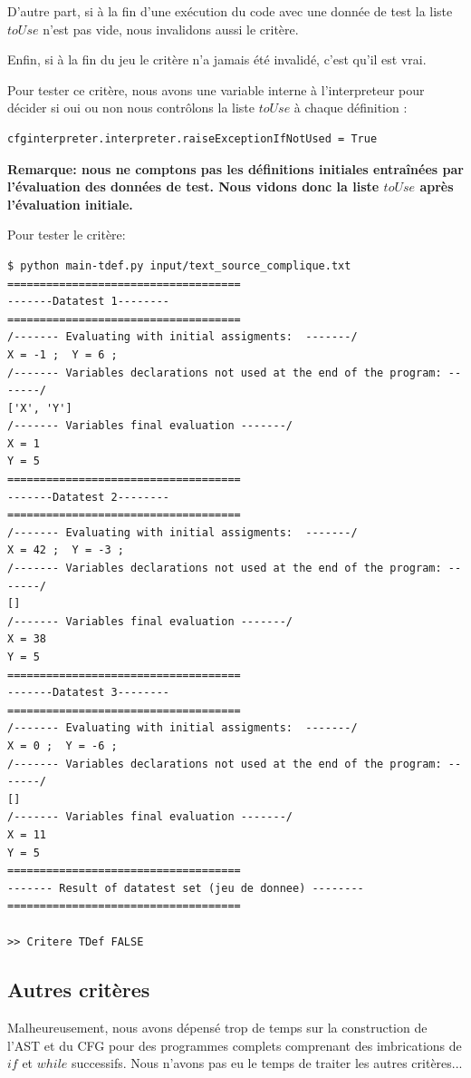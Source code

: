 \documentclass[a4paper]{article}
\begin{document}
D'autre part, si à la fin d'une exécution du code avec une donnée de test la liste $toUse$ n'est pas vide, nous invalidons aussi le critère. 

Enfin, si à la fin du jeu le critère n'a jamais été invalidé, c'est qu'il est vrai. 

Pour tester ce critère, nous avons une variable interne à l'interpreteur pour décider si oui ou non nous contrôlons la liste $toUse$ à chaque définition :
\begin{verbatim}
cfginterpreter.interpreter.raiseExceptionIfNotUsed = True
\end{verbatim}

\textbf{Remarque: nous ne comptons pas les définitions initiales entraînées par l'évaluation des données de test. Nous vidons donc la liste $toUse$ après l'évaluation initiale.}

Pour tester le critère:
\begin{verbatim}
$ python main-tdef.py input/text_source_complique.txt ====================================
-------Datatest 1--------
====================================
/------- Evaluating with initial assigments:  -------/
X = -1 ;  Y = 6 ;
/------- Variables declarations not used at the end of the program: -------/
['X', 'Y']
/------- Variables final evaluation -------/
X = 1
Y = 5
====================================
-------Datatest 2--------
====================================
/------- Evaluating with initial assigments:  -------/
X = 42 ;  Y = -3 ;
/------- Variables declarations not used at the end of the program: -------/
[]
/------- Variables final evaluation -------/
X = 38
Y = 5
====================================
-------Datatest 3--------
====================================
/------- Evaluating with initial assigments:  -------/
X = 0 ;  Y = -6 ;
/------- Variables declarations not used at the end of the program: -------/
[]
/------- Variables final evaluation -------/
X = 11
Y = 5
====================================
------- Result of datatest set (jeu de donnee) --------
====================================

>> Critere TDef FALSE

\end{verbatim}

\subsection{Autres critères}

Malheureusement, nous avons dépensé trop de temps sur la construction de l'AST et du CFG pour des programmes complets comprenant des imbrications de $if$ et $while$ successifs. Nous n'avons pas eu le temps de traiter les autres critères... 
\end{document}
